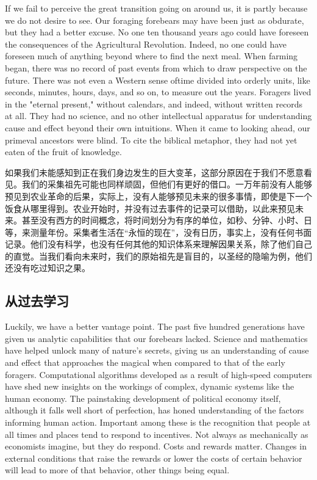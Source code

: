 \begin{Parallel}{97mm}{45mm}
  \ParallelLText
  {If we fail to perceive the great transition going on around us, it is partly because we do not desire to see. Our foraging forebears may have been just as obdurate, but they had a better excuse. No one ten thousand years ago could have foreseen the consequences of the Agricultural Revolution. Indeed, no one could have foreseen much of anything beyond where to find the next meal. When farming began, there was no record of past events from which to draw perspective on the future. There was not even a Western sense oftime divided into orderly units, like seconds, minutes, hours, days, and so on, to measure out the years. Foragers lived in the "eternal present," without calendars, and indeed, without written records at all. They had no science, and no other intellectual apparatus for understanding cause and effect beyond their own intuitions. When it came to looking ahead, our primeval ancestors were blind. To cite the biblical metaphor, they had not yet eaten of the fruit of knowledge.}
  
  \ParallelRText
  {如果我们未能感知到正在我们身边发生的巨大变革，这部分原因在于我们不愿意看见。我们的采集祖先可能也同样顽固，但他们有更好的借口。一万年前没有人能够预见到农业革命的后果，实际上，没有人能够预见未来的很多事情，即使是下一个饭食从哪里得到。农业开始时，并没有过去事件的记录可以借助，以此来预见未来。甚至没有西方的时间概念，将时间划分为有序的单位，如秒、分钟、小时、日等，来测量年份。采集者生活在“永恒的现在”，没有日历，事实上，没有任何书面记录。他们没有科学，也没有任何其他的知识体系来理解因果关系，除了他们自己的直觉。当我们看向未来时，我们的原始祖先是盲目的，以圣经的隐喻为例，他们还没有吃过知识之果。}
  \ParallelPar

  \subsection{从过去学习}

  \ParallelLText
  {Luckily, we have a better vantage point. The past five hundred generations have given us analytic capabilities that our forebears lacked. Science and mathematics have helped unlock many of nature's secrets, giving us an understanding of cause and effect that approaches the magical when compared to that of the early foragers. Computational algorithms developed as a result of high-speed computers have shed new insights on the workings of complex, dynamic systems like the human economy. The painstaking development of political economy itself, although it falls well short of perfection, has honed understanding of the factors informing human action. Important among these is the recognition that people at all times and places tend to respond to incentives. Not always as mechanically as economists imagine, but they do respond. Costs and rewards matter. Changes in external conditions that raise the rewards or lower the costs of certain behavior will lead to more of that behavior, other things being equal.}
  

\end{Parallel}
